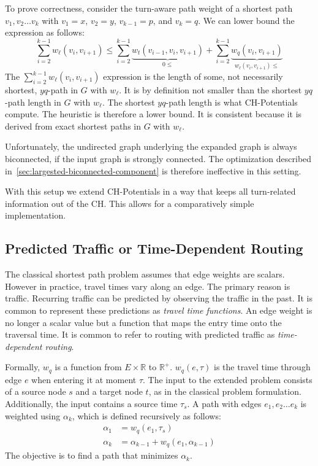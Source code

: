 \documentclass[letterpaper]{article} %
\begin{document}
To prove correctness, consider the turn-aware path weight of a shortest path $v_1,v_2\ldots v_k$ with $v_1=x$, $v_2=y$, $v_{k-1}=p$, and $v_k=q$.
We can lower bound the expression as follows:
\[
\sum_{i=2}^{k-1} w_\ell(v_i,v_{i+1}) \le \sum_{i=2}^{k-1} \underbrace{w_t(v_{i-1},v_i,v_{i+1})}_{0\le} + \sum_{i=2}^{k-1} \underbrace{w_q(v_i,v_{i+1})}_{w_\ell(v_i,v_{i+1})\le}
\]
The $\sum_{i=2}^{k-1} w_\ell(v_i,v_{i+1})$ expression is the length of some, not necessarily shortest, $yq$-path in $G$ with $w_\ell$.
It is by definition not smaller than the shortest $yq$-path length in $G$ with $w_\ell$.
The shortest $yq$-path length is what CH-Potentials compute.
The heuristic is therefore a lower bound.
It is consistent because it is derived from exact shortest paths in $G$ with $w_\ell$.

Unfortunately, the undirected graph underlying the expanded graph is always biconnected, if the input graph is strongly connected.
The optimization described in~\ref{sec:largested-biconnected-component} is therefore ineffective in this setting.

With this setup we extend CH-Potentials in a way that keeps all turn-related information out of the CH.
This allows for a comparatively simple implementation.

\subsection{Predicted Traffic or Time-Dependent Routing}
\label{sec:predicted-traffic}

The classical shortest path problem assumes that edge weights are scalars.
However in practice, travel times vary along an edge.
The primary reason is traffic.
Recurring traffic can be predicted by observing the traffic in the past.
It is common \cite{bgsv-mtdtt-13,bdpw-dtdrp-16,swz-sfert-19} to represent these predictions as \emph{travel time functions}.
An edge weight is no longer a scalar value but a function that maps the entry time onto the traversal time.
It is common to refer to routing with predicted traffic as \emph{time-dependent routing}.

Formally, $w_q$ is a function from $E\times \mathbb{R}$ to $\mathbb{R}^+$.
$w_q(e, \tau)$ is the travel time through edge $e$ when entering it at moment $\tau$.
The input to the extended problem consists of a source node $s$ and a target node $t$, as in the classical problem formulation.
Additionally, the input contains a source time $\tau_s$.
A path with edges $e_1,e_2\ldots e_k$ is weighted using $\alpha_k$, which is defined recursively as follows:\[
\begin{split}
\alpha_{1} & = w_q(e_1, \tau_s) \\
\alpha_{k} & = \alpha_{k-1} + w_q(e_1, \alpha_{k-1})
\end{split}
\]
The objective is to find a path that minimizes $\alpha_k$.
\end{document}
